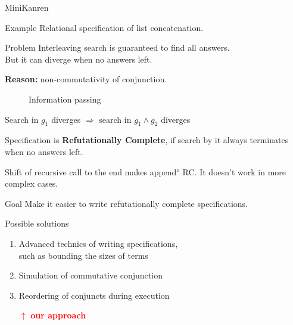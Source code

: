 \documentclass[final,20pt]{beamer}
\begin{document}
\begin{frame}[t]
\begin{columns}[t]
\begin{column}{\onecolwid}
\begin{block}{MiniKanren}
      \begin{exampleblock}{Example}
        Relational specification of list concatenation.
        
      \end{exampleblock}
    \end{block}
    
    \begin{block}{Problem}
      Interleaving search is guaranteed to find all answers. \\
      But it can diverge when no answers left.
      
      \textbf{Reason:} non-commutativity of conjunction.
      \begin{figure}
        \large{Information passing}\\
      \end{figure}
      Search in $g_1$ diverges $\Rightarrow$ search in $g_1 \wedge g_2$ diverges
      \bigskip
      \bigskip
      
      Specification is \textbf{Refutationally Complete}, if search by it always terminates when no answers left.
      \bigskip
      
      Shift of recursive call to the end makes {\ttfamily append$^o$} RC.
      It doesn't work in more complex cases.
    \end{block}

    \begin{alertblock}{Goal}
        Make it easier to write refutationally complete specifications.
    \end{alertblock}
    
    \begin{block}{Possible solutions}
      \begin{enumerate}
        \item Advanced technics of writing specifications, \\ such as bounding the sizes of terms
        \item Simulation of commutative conjunction
        \item Reordering of conjuncts during execution
        \item[\textcolor{red}{$\uparrow$}] \textcolor{red}{ \textbf{our approach} }
      \end{enumerate}
    \end{block}
  

\end{column}
\end{columns}
\end{frame}
\end{document}
